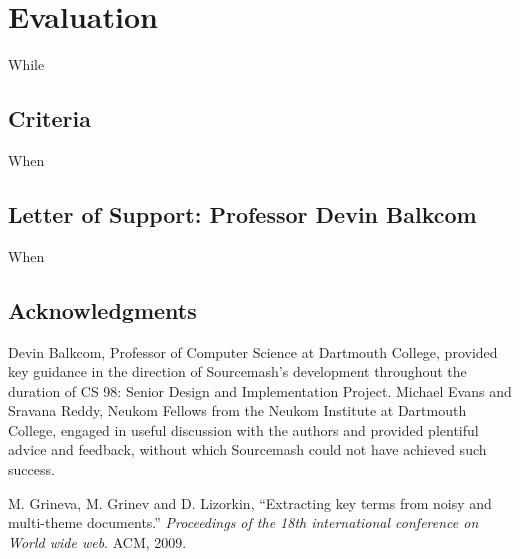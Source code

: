 \documentclass[11pt]{article}
\begin{document}
\section{Evaluation}

While

\subsection{Criteria}

When

\subsection{Letter of Support: Professor Devin Balkcom}

When



\subsection*{Acknowledgments}
Devin Balkcom, Professor of Computer Science at Dartmouth College, provided key guidance in the direction of Sourcemash's development throughout the duration of CS 98: Senior Design and Implementation Project. Michael Evans and Sravana Reddy, Neukom Fellows from the Neukom Institute at Dartmouth College, engaged in useful discussion with the authors and provided plentiful advice and feedback, without which Sourcemash could not have achieved such success.


\begin{thebibliography}{99}

  M. Grineva, M. Grinev and D. Lizorkin, ``Extracting key terms from noisy and multi-theme documents.'' \emph{Proceedings of the 18th international conference on World wide web}. ACM, 2009.
\end{thebibliography}
\end{document}
